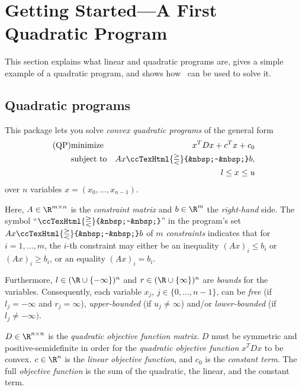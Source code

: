 \newcommand{\qprel}{\ccTexHtml{\gtreqless}{&nbsp;~&nbsp;}}

\label{QP_solver}

\section{Getting Started---A First Quadratic Program}
This section explains what linear and quadratic programs are, gives a
simple example of a quadratic program, and shows how \cgal\ can be used
to solve it.

\subsection{Quadratic programs}
This package lets you solve \emph{convex quadratic programs} of the 
general form
\begin{eqnarray*}
\mbox{(QP)}&\mbox{minimize} & x^{T}Dx + c^{T}x + c_0 \\
&\mbox{subject to}   & Ax\qprel b, \\
&& l \leq x \leq u
\end{eqnarray*}
over $n$ variables $x=(x_0,\ldots,x_{n-1})$.

Here, $A \in \R^{m \times n}$ is the \emph{constraint matrix} and $b
\in \R^{m}$ the \emph{right-hand} side. The symbol ``$\qprel$'' in the
program's set $Ax \qprel b$ of $m$ \emph{constraints} indicates that for
$i=1,\ldots,m$, the $i$-th constraint may either be an inequality
$(Ax)_i \leq b_i$ or $(Ax)_i \geq b_i$, or an equality $(Ax)_i = b_i$.

Furthermore, $l\in
(\R\cup\{-\infty\})^n$ and $r\in (\R\cup\{\infty\})^n$ are \emph{bounds}
for the variables. Consequently, each
variable $x_j$, $j\in\{0,\ldots,n-1\}$, can be \emph{free} (if
$l_j=-\infty$ and $r_j=\infty$), \emph{upper-bounded} (if
$u_j\neq\infty$) and/or \emph{lower-bounded} (if
$l_j\neq-\infty)$.  

$D \in \R^{n \times n}$ is the \emph{quadratic
objective function matrix}. $D$ must be symmetric and 
positive-semidefinite in order for the \emph{quadratic objective function}
$x^{T}Dx$ to be convex. $c \in \R^{n}$ is the \emph{linear
objective function}, and $c_0$ is the \emph{constant term}. The full
\emph{objective function} is the sum of the quadratic, the linear, and
the constant term.


